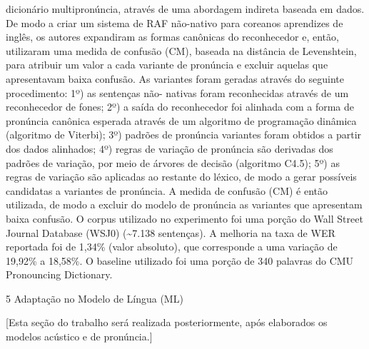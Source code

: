 dicion\'ario multipron\'uncia, atrav\'es de uma abordagem indireta baseada em
dados. De modo a criar um sistema de RAF n\~ao-nativo para coreanos
aprendizes de ingl\^es, os autores expandiram as formas can\^onicas do
reconhecedor e, ent\~ao, utilizaram uma medida de confus\~ao (CM), baseada
na dist\^ancia de Levenshtein, para atribuir um valor a cada variante de
pron\'uncia e excluir aquelas que apresentavam baixa confus\~ao. As
variantes foram geradas atrav\'es do seguinte procedimento: 1º) as
senten\c{c}as n\~ao- nativas foram reconhecidas atrav\'es de um reconhecedor de
fones; 2º) a sa\'ida do reconhecedor foi alinhada com a forma de pron\'uncia
can\^onica esperada atrav\'es de um algoritmo de programa\c{c}\~ao din\^amica
(algoritmo de Viterbi); 3º) padr\~oes de pron\'uncia variantes foram obtidos
a partir dos dados alinhados; 4º) regras de varia\c{c}\~ao de pron\'uncia s\~ao
derivadas dos padr\~oes de varia\c{c}\~ao, por meio de \'arvores de decis\~ao
(algoritmo C4.5); 5º) as regras de varia\c{c}\~ao s\~ao aplicadas ao restante do
l\'exico, de modo a gerar poss\'iveis candidatas a variantes de pron\'uncia. A
medida de confus\~ao (CM) \'e ent\~ao utilizada, de modo a excluir do modelo
de pron\'uncia as variantes que apresentam baixa confus\~ao. O corpus
utilizado no experimento foi uma por\c{c}\~ao do Wall Street Journal Database
(WSJ0) (\textasciitilde{}7.138 senten\c{c}as). A melhoria na taxa de WER
reportada foi de 1,34\% (valor absoluto), que corresponde a uma varia\c{c}\~ao
de 19,92\% a 18,58\%. O baseline utilizado foi uma por\c{c}\~ao de 340
palavras do CMU Pronouncing Dictionary.

5 Adapta\c{c}\~ao no Modelo de L\'ingua (ML)

{[}Esta se\c{c}\~ao do trabalho ser\'a realizada posteriormente, ap\'os elaborados
os modelos ac\'ustico e de pron\'uncia.{]}


